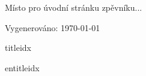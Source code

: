 \documentclass[letterpaper]{article}
\begin{document}
\thispagestyle{empty}
{\huge Místo pro úvodní stránku zpěvníku... }\par
\vspace*{\fill}
Vygenerováno: \today
\newpage

\thispagestyle{empty} %
\thispagestyle{empty}

\begin{songs}{titleidx}

\end{songs}

\begin{songs}{entitleidx}
	
\end{songs}
\end{document}
